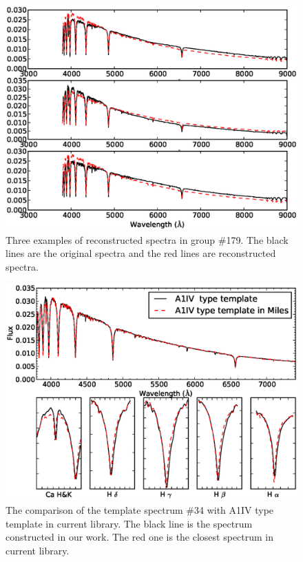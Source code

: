 \documentclass[manuscript]{aastex}
\begin{document}
 \begin{figure}
   \centering
   \includegraphics[width=14cm, angle=0,clip]{f82.eps}
   \caption{Three examples of reconstructed spectra in group \#179.
The black lines are the original spectra and the red lines are reconstructed spectra.
   }
   \label{Fig82}
\end{figure}
\begin{figure}
   \centering
   \includegraphics[width=14cm, angle=0,clip]{f92.eps}
   \caption{The comparison of the template spectrum \#34 with  A1IV type template in current library.
The black line is the spectrum constructed in our work.
The red one is the closest spectrum in current library.
   }
   \label{Fig92}
\end{figure}
\end{document}
